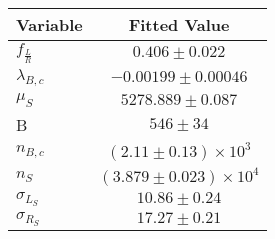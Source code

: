 \begin{tabular}[t]{lc}
\hline
Variable &Fitted Value\\
\hline\hline
$f_{\frac{L}{R}}$&$0.406\pm0.022$\\
\hline
$\lambda_{B,c}$&$-0.00199\pm0.00046$\\
\hline
$\mu_S$&$5278.889\pm0.087$\\
\hline
B&$546\pm34$\\
\hline
$n_{B,c}$&$(2.11\pm0.13)\times 10^3$\\
\hline
$n_S$&$(3.879\pm0.023)\times 10^4$\\
\hline
$\sigma_{L_S}$&$10.86\pm0.24$\\
\hline
$\sigma_{R_S}$&$17.27\pm0.21$\\
\hline
\end{tabular}
